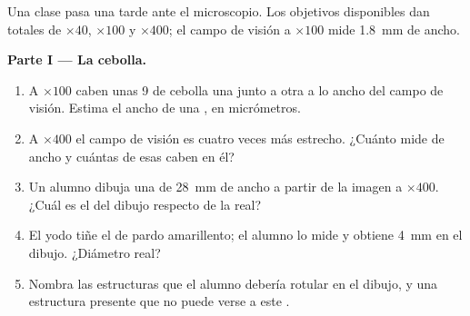 \begin{problem}
\label{pb:g10:cells-common-unit:1}
Una clase pasa una tarde ante el microscopio. Los objetivos disponibles
dan  totales de $\times 40$, $\times 100$ y $\times 400$; el
campo de visión a $\times 100$ mide \qty{1.8}{mm} de ancho.

\medskip
\noindent\textbf{Parte I --- La cebolla.}
\begin{enumerate}
  \item A $\times 100$ caben unas 9  de cebolla una junto a otra
        a lo ancho del campo de visión. Estima el ancho de una ,
        en micrómetros.
  \item A $\times 400$ el campo de visión es cuatro veces más estrecho.
        ¿Cuánto mide de ancho y cuántas de esas  caben en él?
  \item Un alumno dibuja una  de \qty{28}{mm} de ancho a partir
        de la imagen a $\times 400$. ¿Cuál es el  del dibujo
        respecto de la  real?
  \item El yodo tiñe el  de pardo amarillento; el alumno lo mide
        y obtiene \qty{4}{mm} en el dibujo. ¿Diámetro real?
  \item Nombra las estructuras que el alumno debería rotular en el
        dibujo, y una estructura presente que no puede verse a este
        .
\end{enumerate}


\end{problem}
